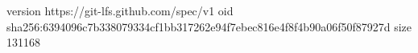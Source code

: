 version https://git-lfs.github.com/spec/v1
oid sha256:6394096c7b338079334cf1bb317262e94f7ebec816e4f8f4b90a06f50f87927d
size 131168
